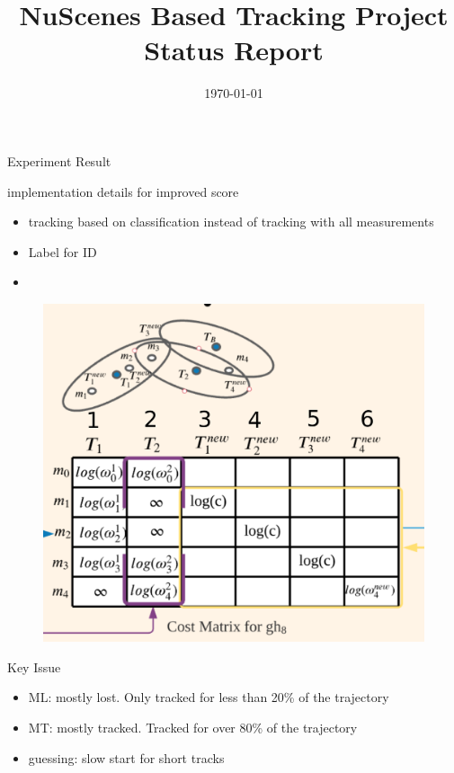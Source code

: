 \documentclass[aspectratio=169,xcolor=dvipsnames]{beamer}
\title{NuScenes Based Tracking Project Status Report} %
\date{\today} %
\begin{document}
\begin{frame}
    \titlepage
\end{frame}

\begin{frame}{Experiment Result}
    \href{https://docs.google.com/spreadsheets/d/e/2PACX-1vQg2MSCst4ShlC0e7T_lr_q4azo-DfDo53On89BjeisHAKJrggMLoTUxcvurpXomLZilYKoWmMMf6U4/pubhtml}{}
    \href{https://motchallenge.net/results/CVPR_2019_Tracking_Challenge/}{}
\end{frame}

\begin{frame}{implementation details for improved score}
    \begin{itemize}
        \item{tracking based on classification instead of tracking with all measurements}
        \item{Label for ID}
        \item {}
    \end{itemize}
    \begin{figure}
        \includegraphics[width=0.4\linewidth]{pmbm/2.png}
    \end{figure}
\end{frame}

\begin{frame}{Key Issue}
    \begin{itemize}
        \item{ML: mostly lost. Only tracked for less than 20\% of the trajectory}
        \item{MT: mostly tracked. Tracked for over 80\% of the trajectory}
        \item{guessing: slow start for short tracks}
    \end{itemize}
\end{frame}
\end{document}
